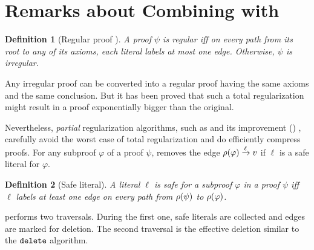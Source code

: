 \documentclass{easychair}
\newtheorem{definition}{Definition}
\begin{document}



\appendix

\section{Remarks about Combining {\LowerUnivalents} with {\RPI}} \label{sec:LUnivRPI}

\begin{definition}[Regular proof \cite{Tseitin}]
A proof $\psi$ is \emph{regular} iff on every path from its root to any of its axioms, each literal
labels at most one edge. Otherwise, $\psi$ is \emph{irregular}.
\end{definition}

Any irregular proof can be converted into a regular proof having the same axioms and the same
conclusion. But it has been proved \cite{Goerdt} that such a total regularization might result in a
proof exponentially bigger than the original. 

Nevertheless, \emph{partial} regularization algorithms, such as {\RecyclePivots} \cite{RP08} and its improvement {\RecyclePivotsIntersection} ({\RPI}) \cite{LURPI}, carefully avoid the worst case of total regularization and do efficiently compress proofs.  For
any subproof $\varphi$ of a proof $\psi$, {\RPI} removes the edge $\rho(\varphi) \xrightarrow{\ell}
v$ if $\ell$ is a safe literal for $\varphi$.

\begin{definition}[Safe literal]
A literal $\ell$ is \emph{safe} for a subproof $\varphi$ in a proof $\psi$ iff $\ell$ labels at
least one edge on every path from $\rho(\psi)$ to $\rho(\varphi)$.
\end{definition}

{\RPI} performs two traversals. During the first one, safe literals are collected and edges are
marked for deletion. The second traversal is the effective deletion similar to the
$\FuncSty{delete}$ algorithm.
\end{document}
